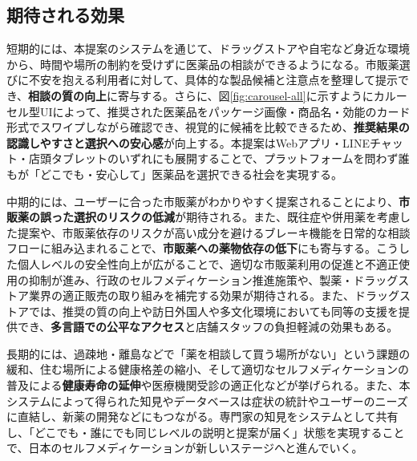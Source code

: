 \documentclass[11pt,a4paper,ja=minimal,xelatex]{bxjsarticle}
\begin{document}
\subsection*{期待される効果}
短期的には、本提案のシステムを通じて、ドラッグストアや自宅など身近な環境から、時間や場所の制約を受けずに医薬品の相談ができるようになる。市販薬選びに不安を抱える利用者に対して、具体的な製品候補と注意点を整理して提示でき、\textbf{相談の質の向上}に寄与する。さらに、図\ref{fig:carousel-all}に示すようにカルーセル型UIによって、推奨された医薬品をパッケージ画像・商品名・効能のカード形式でスワイプしながら確認でき、視覚的に候補を比較できるため、\textbf{推奨結果の認識しやすさと選択への安心感}が向上する。本提案はWebアプリ・LINEチャット・店頭タブレットのいずれにも展開することで、プラットフォームを問わず誰もが「どこでも・安心して」医薬品を選択できる社会を実現する。

中期的には、ユーザーに合った市販薬がわかりやすく提案されることにより、\textbf{市販薬の誤った選択のリスクの低減}が期待される。また、既往症や併用薬を考慮した提案や、市販薬依存のリスクが高い成分を避けるブレーキ機能を日常的な相談フローに組み込まれることで、\textbf{市販薬への薬物依存の低下}にも寄与する。こうした個人レベルの安全性向上が広がることで、適切な市販薬利用の促進と不適正使用の抑制が進み、行政のセルフメディケーション推進施策や、製薬・ドラッグストア業界の適正販売の取り組みを補完する効果が期待される。また、ドラッグストアでは、推奨の質の向上や訪日外国人や多文化環境においても同等の支援を提供でき、\textbf{多言語での公平なアクセス}と店舗スタッフの負担軽減の効果もある。

長期的には、過疎地・離島などで「薬を相談して買う場所がない」という課題の緩和、住む場所による健康格差の縮小、そして適切なセルフメディケーションの普及による\textbf{健康寿命の延伸}や医療機関受診の適正化などが挙げられる。また、本システムによって得られた知見やデータベースは症状の統計やユーザーのニーズに直結し、新薬の開発などにもつながる。専門家の知見をシステムとして共有し、「どこでも・誰にでも同じレベルの説明と提案が届く」状態を実現することで、日本のセルフメディケーションが新しいステージへと進んでいく。
\end{document}
